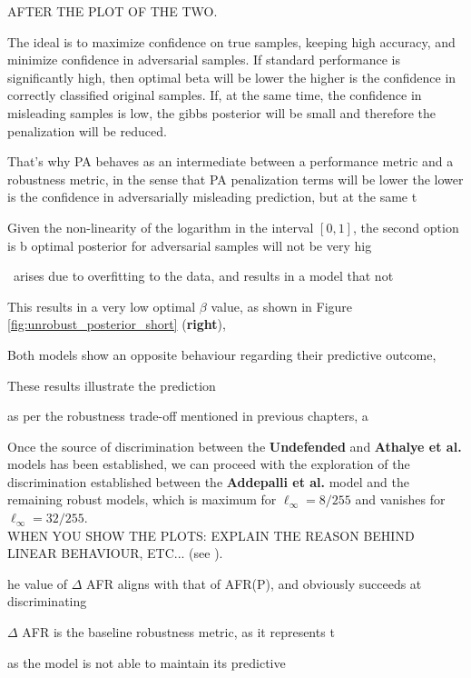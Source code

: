 AFTER THE PLOT OF THE TWO.

The ideal is to maximize confidence on true samples, keeping high accuracy, 
and minimize confidence in adversarial samples. If standard performance is significantly high,
then optimal beta will be lower the higher is the confidence in correctly classified original samples.
If, at the same time, the confidence in misleading samples is low, the gibbs posterior will be small
and therefore the penalization will be reduced. 

That's why PA behaves as an intermediate between a performance metric and a robustness metric,
in the sense that PA penalization terms will be lower the lower is the confidence in
adversarially misleading prediction, but at the same t

Given the non-linearity of the logarithm in
the interval $[0,1]$, the second option is b
optimal posterior for adversarial samples will not be very hig


\
 arises due to overfitting to the data, and results in a model that
not


This
results in a very low optimal $\beta$ value, as shown in Figure \ref{fig:unrobust_posterior_short} (\textbf{right}),




Both models show an opposite behaviour regarding their predictive outcome,

These results illustrate the prediction 



as per the robustness trade-off
mentioned in previous chapters, a

Once the source of discrimination between the {\color{tab:orange} \textbf{Undefended}} and
{\color{tab:green} \textbf{Athalye et al.}} models has been established, we can proceed 
with the exploration of the discrimination established between the {\color{tab:purple} \textbf{Addepalli et al.}}
model and the remaining robust models, which is maximum for $\ell_\infty = 8 / 255$ and
vanishes for $\ell_\infty = 32 / 255$. \\


WHEN YOU SHOW THE PLOTS: EXPLAIN THE REASON BEHIND LINEAR BEHAVIOUR, ETC...
(see ).

he value of $\Delta$ AFR aligns
with that of AFR(P), and obviously succeeds at discriminating 

$\Delta$ AFR is
the baseline robustness metric, as it represents t

as the model is not able to maintain its predictive

